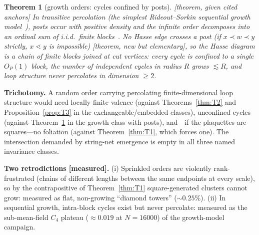\documentclass[aps,prd,reprint,nofootinbib,superscriptaddress,floatfix]{revtex4-2}
\newtheorem{theorem}{Theorem}
\theoremstyle{definition}
\begin{document}
\begin{theorem}[growth orders: cycles confined by posts]
\label{thm:T4}
{\rm[theorem, given cited anchors]} In transitive percolation (the simplest
Rideout--Sorkin sequential growth model~\cite{RideoutSorkin2000}), posts occur with
positive density and the infinite order decomposes into an ordinal sum of i.i.d.\ finite
blocks~\cite{ABBJ1994,BollobasBrightwell1997}. No Hasse edge crosses a post (if
$x\prec w\prec y$ strictly, $x\lessdot y$ is impossible) [theorem, new but elementary],
so the Hasse diagram is a chain of finite blocks joined at cut vertices: every cycle is
confined to a single $O_P(1)$ block, the number of independent cycles in radius $R$
grows $\lesssim R$, and loop structure never percolates in dimension $\ge2$.
\end{theorem}

\noindent\textbf{Trichotomy.} A random order carrying percolating finite-dimensional
loop structure would need locally finite valence (against Theorems~\ref{thm:T2} and
Proposition~\ref{prop:T3} in the exchangeable/embedded classes), unconfined cycles
(against Theorem~\ref{thm:T4} in the growth class with posts), and---if the plaquettes
are squares---no foliation (against Theorem~\ref{thm:T1}, which forces one). The
intersection demanded by string-net emergence is empty in all three named invariance
classes.

\noindent\textbf{Two retrodictions [measured].} (i) Sprinkled orders are violently
rank-frustrated (chains of different lengths between the same endpoints at every scale),
so by the contrapositive of Theorem~\ref{thm:T1} square-generated clusters cannot grow:
measured as flat, non-growing ``diamond towers'' ($\sim0.25\%$). (ii) In sequential
growth, intra-block cycles exist but never percolate: measured as the sub-mean-field
$C_4$ plateau ($\approx0.019$ at $N=16000$) of the growth-model campaign.
\end{document}

